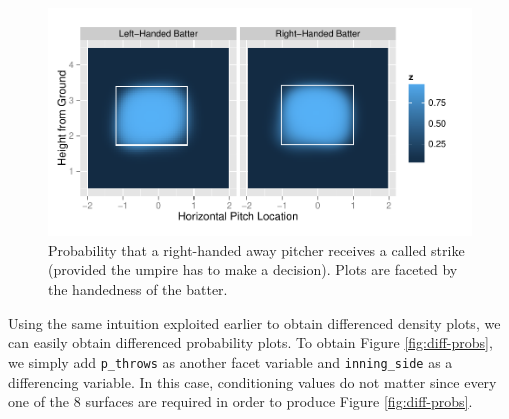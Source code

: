 \documentclass[12pt,]{isuthesis}
\newenvironment{Shaded}{\begin{snugshade}}{\end{snugshade}}
\newcommand{\KeywordTok}[1]{\textcolor[rgb]{0.13,0.29,0.53}{\textbf{{#1}}}}
\newcommand{\DataTypeTok}[1]{\textcolor[rgb]{0.13,0.29,0.53}{{#1}}}
\newcommand{\StringTok}[1]{\textcolor[rgb]{0.31,0.60,0.02}{{#1}}}
\newcommand{\CommentTok}[1]{\textcolor[rgb]{0.56,0.35,0.01}{\textit{{#1}}}}
\newcommand{\NormalTok}[1]{{#1}}
\begin{document}
\begin{figure}[htbp]
\centering
\includegraphics{images/prob-strike.pdf}
\caption{\label{fig:strike-probs}Probability that a right-handed away
pitcher receives a called strike (provided the umpire has to make a
decision). Plots are faceted by the handedness of the batter.}
\end{figure}

Using the same intuition exploited earlier to obtain differenced density
plots, we can easily obtain differenced probability plots. To obtain
Figure \ref{fig:diff-probs}, we simply add \texttt{p\_throws} as another
facet variable and \texttt{inning\_side} as a differencing variable. In
this case, conditioning values do not matter since every one of the 8
surfaces are required in order to produce Figure \ref{fig:diff-probs}.

\begin{Shaded}
\end{Shaded}
\end{document}
